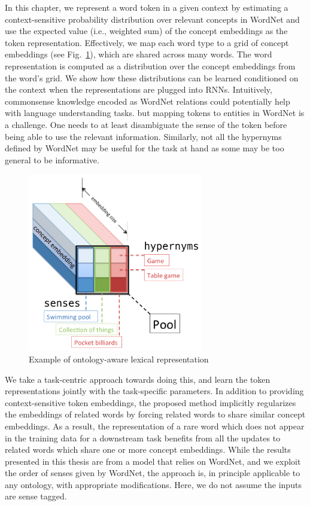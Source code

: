 In this chapter, we represent a word token in a given context by estimating a 
context-sensitive probability distribution over relevant concepts in WordNet 
\cite{miller1995wordnet} and use the expected value (i.e., weighted sum) of the 
concept embeddings as the token representation.
Effectively, we map each word type to a grid of concept embeddings (see 
Fig.~\ref{fig:ontolstm_tensor}), which are shared across many words. The word 
representation is computed as a distribution over the concept embeddings from 
the word's grid. We show how these distributions can be 
learned conditioned on the context when the representations are plugged into 
RNNs.
Intuitively, commonsense knowledge encoded as WordNet relations could 
potentially help with language understanding tasks. 
but mapping tokens to entities in WordNet is a challenge. One needs to at least 
disambiguate the sense of the token before being able to use the relevant 
information. Similarly, not all the hypernyms defined by WordNet may be useful 
for the task at hand as some may be too general to be informative.
 
\begin{figure}[t]
\begin{center}
\includegraphics[width=3in]{figures/tensor2.png}
\caption{Example of ontology-aware lexical representation}
\label{fig:ontolstm_tensor}
\end{center}
\end{figure}

We take a task-centric approach towards doing this, and learn the token 
representations jointly with the task-specific parameters.
In addition to providing context-sensitive token embeddings, the proposed method 
implicitly regularizes the embeddings of related words by forcing related words 
to share similar concept embeddings. 
As a result, the representation of a rare word which does not appear in the 
training data for a downstream task benefits from all the updates to related 
words which share one or more concept embeddings. While the results presented in this thesis are from a model that relies on WordNet, 
and we exploit the order of senses given by WordNet, the approach is, in principle 
applicable to any ontology, with appropriate modifications. Here, we do not assume the inputs are 
sense tagged.


